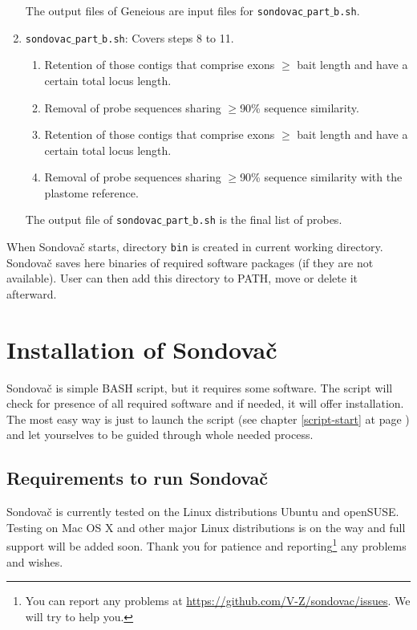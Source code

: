\documentclass[a4paper, 11pt, twoside]{article}
\begin{document}
\begin{enumerate}[label=\textbf{\Alph*.}]
  The output files of Geneious are input files for \texttt{sondovac$\_$part$\_$b.sh}.

  \item \texttt{sondovac$\_$part$\_$b.sh}: Covers steps 8 to 11.
    \begin{enumerate}[label=\textbf{\arabic*.}, resume]
      \item Retention of those contigs that comprise exons $\geq$ bait length and have a certain total locus length.
      \item Removal of probe sequences sharing $\geq$90\% sequence similarity.
      \item Retention of those contigs that comprise exons $\geq$ bait length and have a certain total locus length.
      \item Removal of probe sequences sharing $\geq$90\% sequence similarity with the plastome reference.
    \end{enumerate}

  The output file of \texttt{sondovac$\_$part$\_$b.sh} is the final list of probes.

\end{enumerate}

When Sondovač starts, directory \texttt{bin} is created in current working directory. Sondovač saves here binaries of required software packages (if they are not available). User can then add this directory to PATH, move or delete it afterward.

\section{Installation of Sondovač}
\label{install}

Sondovač is simple BASH script, but it requires some software. The script will check for presence of all required software and if needed, it will offer installation. The most easy way is just to launch the script (see chapter \ref{script-start} at page \pageref{script-start}) and let yourselves to be guided through whole needed process.

\subsection{Requirements to run Sondovač}

Sondovač is currently tested on the Linux distributions Ubuntu and openSUSE. Testing on Mac OS X and other major Linux distributions is on the way and full support will be added soon. Thank you for patience and reporting\footnote{You can report any problems at \href{https://github.com/V-Z/sondovac/issues}{https://github.com/V-Z/sondovac/issues}. We will try to help you.} any problems and wishes.
\end{document}
